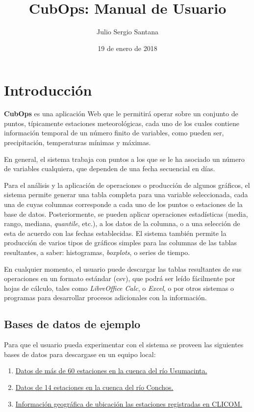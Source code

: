 \documentclass[spanish,]{article}
\title{CubOps: Manual de Usuario}
\author{Julio Sergio Santana}
\date{19 de enero de 2018}
\providecommand{\tightlist}{%
  \setlength{\itemsep}{0pt}\setlength{\parskip}{0pt}}
\begin{document}
\maketitle

{
\setcounter{tocdepth}{2}
\tableofcontents
}
\section{Introducción}\label{introduccion}

\textbf{CubOps} es una aplicación Web que le permitirá operar sobre un
conjunto de puntos, típicamente estaciones meteorológicas, cada uno de
los cuales contiene información temporal de un número finito de
variables, como pueden ser, precipitación, temperaturas mínimas y
máximas.

En general, el sistema trabaja con puntos a los que se le ha asociado un
número de variables cualquiera, que dependen de una fecha secuencial en
días.

Para el análisis y la aplicación de operaciones o producción de algunos
gráficos, el sistema permite generar una tabla completa para una
variable seleccionada, cada una de cuyas columnas corresponde a cada uno
de los puntos o estaciones de la base de datos. Posteriormente, se
pueden aplicar operaciones estadísticas (media, rango, mediana,
\emph{quantile}, etc.), a los datos de la columna, o a una selección de
esta de acuerdo con las fechas establecidas. El sistema también permite
la producción de varios tipos de gráficos simples para las columnas de
las tablas resultantes, a saber: histogramas, \emph{boxplots}, o series
de tiempo.

En cualquier momento, el usuario puede descargar las tablas resultantes
de sus operaciones en un formato estándar (csv), que podrá ser leído
fácilmente por hojas de cálculo, tales como \emph{LibreOffice Calc}, o
\emph{Excel}, o por otros sistemas o programas para desarrollar procesos
adicionales con la información.

\subsection{Bases de datos de ejemplo}\label{bases-de-datos-de-ejemplo}

Para que el usuario pueda experimentar con el sistema se proveen las
siguientes bases de datos para descargase en un equipo local:

\begin{enumerate}
\def\labelenumi{\arabic{enumi}.}
\tightlist
\item
  \href{http://172.16.19.27:3000/databases/UsumacintaDatos.zip}{Datos de
  más de 60 estaciones en la cuenca del río Usumacinta.}
\item
  \href{http://172.16.19.27:3000/databases/ConchosDatos.zip}{Datos de 14
  estaciones en la cuenca del río Conchos.}
\item
  \href{http://172.16.19.27:3000/databases/Estaciones.csv}{Información
  geográfica de ubicación las estaciones registradas en CLICOM.}
\end{enumerate}
\end{document}
